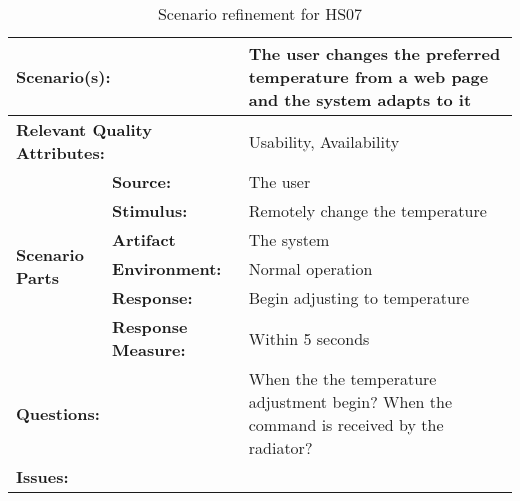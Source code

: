 \documentclass[10pt,a4paper]{article}
\begin{document}
\begin{table}[!htp]
\begin{center}
\begin{tabular}{|p{0.3cm}|p{2.5cm}|p{8cm}|}
  \hline
  \multicolumn{2}{|p{3cm}|}{\bfseries Scenario(s):} & The user changes the preferred temperature from a web page and the system adapts to it \\
  \hline
  \multicolumn{2}{|p{3cm}|}{\bfseries Relevant Quality Attributes:} & Usability,  Availability \\
  \hline
  \multirow{6}{*}{\begin{sideways}{\bfseries Scenario Parts}\end{sideways}}
  & {\bfseries Source:} & The user \\
  \cline{2-3}
  & {\bfseries Stimulus:} & Remotely change the temperature \\
  \cline{2-3}
  & {\bfseries Artifact} & The system \\
  \cline{2-3}
  & {\bfseries Environment:} & Normal operation \\
  \cline{2-3}
  & {\bfseries Response:} & Begin adjusting to temperature \\
  \cline{2-3}
  & {\bfseries Response Measure:} & Within 5 seconds \\
  \hline
  \multicolumn{2}{|p{3cm}|}{\bfseries Questions:} & When the the temperature adjustment begin? When the command is received by the radiator? \\
  \hline
  \multicolumn{2}{|p{3cm}|}{\bfseries Issues:} &  \\
  \hline
\end{tabular}
\caption{Scenario refinement for HS07}
\end{center}
\end{table}
\end{document}
